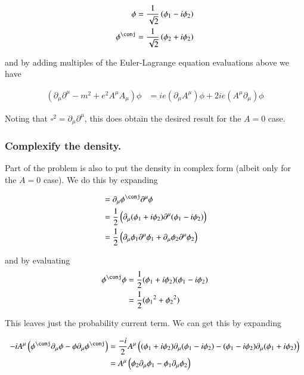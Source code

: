 \documentclass{article}
\begin{document}
\begin{align*}
\phi &= \inv{\sqrt{2}}\left( \phi_1 - i \phi_2 \right) \\
\phi^\conj &= \inv{\sqrt{2}}\left( \phi_2 + i \phi_2 \right) \\
\end{align*}

and by adding multiples of the Euler-Lagrange equation evaluations above we have

\begin{align}\label{eqn:complexifiedSolution}
\left( \partial_\mu \partial^\mu -m^2 + e^2 A^\mu A_\mu \right) \phi &= i e (\partial_\mu A^\mu) \phi + 2 i e (A^\mu \partial_\mu) \phi 
\end{align}

Noting that $\square^2 = \partial_\mu \partial^\mu$, this does obtain the desired result for the $A=0$ case.

\subsubsection{ Complexify the density. }

Part of the problem is also to put the density in complex form (albeit only for the $A=0$ case).  We do this by expanding

\begin{align*}
&= \partial_\mu \phi^\conj \partial^\mu \phi \\
&=
\inv{2} \left( \partial_\mu (\phi_1 + i \phi_2) \partial^\mu (\phi_1 - i \phi_2) \right) \\
&=
\inv{2} \left( \partial_\mu \phi_1 \partial^\mu \phi_1 + \partial_\mu \phi_2 \partial^\mu \phi_2 \right) \\
\end{align*}

and by evaluating
\begin{align*}
\phi^\conj \phi 
&= \inv{2} (\phi_1 + i \phi_2) (\phi_1 - i \phi_2) \\
&= \inv{2} ({\phi_1}^2 + {\phi_2}^2 )
\end{align*}

This leaves just the probability current term.  We can get this by expanding

\begin{align*}
- i A^\mu \left( \phi^\conj \partial_\mu \phi - \phi \partial_\mu \phi^\conj \right)
&=
\frac{-i}{2} A^\mu \left( (\phi_1 + i \phi_2) \partial_\mu (\phi_1 - i \phi_2) - (\phi_1 - i \phi_2) \partial_\mu (\phi_1 + i \phi_2) \right) \\
&=
A^\mu \left( \phi_2 \partial_\mu \phi_1 - \phi_1 \partial_\mu \phi_2 \right)
\end{align*}
\end{document}
